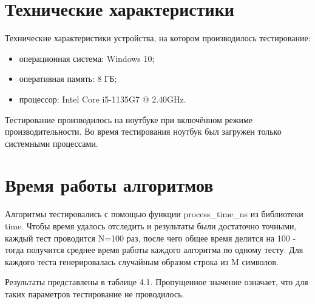 \section{Технические характеристики}
Технические характеристики устройства, на котором производилось тестирование:
\begin{itemize}
    \item операционная система: Windows 10;
    \item оперативная память: 8 ГБ;
    \item процессор: Intel Core i5-1135G7 @ 2.40GHz.
\end{itemize}

Тестирование производилось на ноутбуке при включённом режиме производительности. Во время тестирования ноутбук был загружен только системными процессами.

\section{Время работы алгоритмов}
Алгоритмы тестировались с помощью функции process\_time\_ns из библиотеки time. Чтобы время удалось отследить и результаты были достаточно точными, каждый тест проводится N=100 раз, после чего общее время делится на 100 - тогда получится среднее время работы каждого алгоритма по одному тесту. Для каждого теста генерировалась случайным образом строка из M символов.

Результаты представлены в таблице 4.1. Пропущенное значение означает, что для таких параметров тестирование не проводилось.

